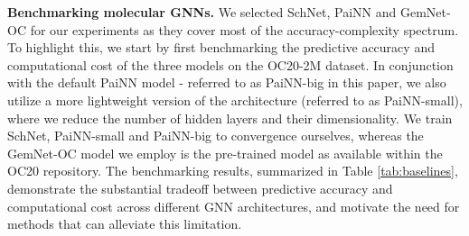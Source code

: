 \documentclass{article}
\begin{document}
\textbf{Benchmarking molecular GNNs.} 
We selected SchNet, PaiNN and GemNet-OC for our experiments as they cover most of the accuracy-complexity spectrum. To highlight this, we start by first benchmarking the predictive accuracy and computational cost of the three models on the OC20-2M \cite{chanussot_open_2021} dataset. In conjunction with the default PaiNN model - referred to as PaiNN-big in this paper, we also utilize a more lightweight version of the architecture (referred to as PaiNN-small), where we reduce the number of hidden layers and their dimensionality. We train SchNet, PaiNN-small and PaiNN-big to convergence ourselves, whereas the GemNet-OC model we employ is the pre-trained model as available within the OC20 repository.
The benchmarking results, summarized in Table \ref{tab:baselines}, 
demonstrate the substantial tradeoff between predictive accuracy and computational cost across different GNN architectures, and motivate the need for methods that can alleviate this limitation. 
\end{document}
